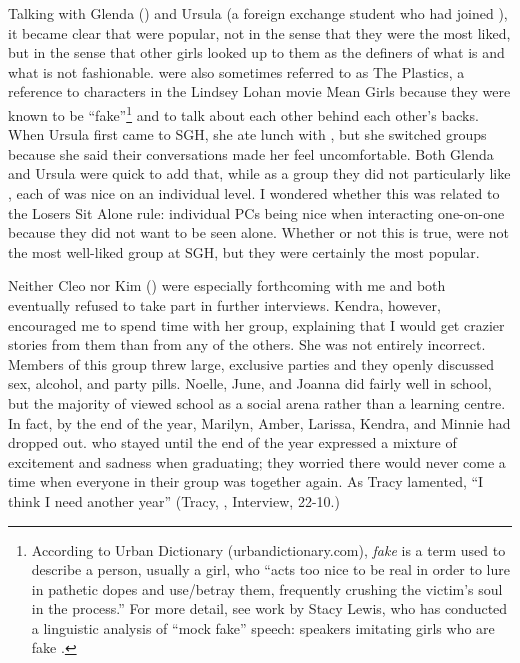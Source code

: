 Talking with Glenda () and Ursula (a foreign exchange student who had joined ), it became clear that  were popular, not in the sense that they were the most liked, but in the sense that other girls looked up to them as the definers of what is and what is not fashionable.  were also sometimes referred to as The Plastics, a reference to characters in the Lindsey Lohan movie Mean Girls because they were known to be ``fake''\footnote{According to Urban Dictionary (urbandictionary.com), \textit{fake} is a term used to describe a person, usually a girl, who ``acts too nice to be real in order to lure in pathetic dopes and use/betray them, frequently crushing the victim's soul in the process.''  For more detail, see work by Stacy Lewis, who has conducted a linguistic analysis of ``mock fake'' speech: speakers imitating girls who are fake \citep{lewis2007}.} and to talk about each other behind each other's backs. When Ursula first came to SGH, she ate lunch with , but she switched groups because she said their conversations made her feel uncomfortable. Both Glenda and Ursula were quick to add that, while as a group they did not particularly like , each of  was nice on an individual level. I wondered whether this was related to the Losers Sit Alone rule: individual PCs being nice when interacting one-on-one because they did not want to be seen alone. Whether or not this is true,  were not the most well-liked group at SGH, but they were certainly the most popular.


Neither Cleo nor Kim () were especially forthcoming with me and both eventually refused to take part in further interviews. Kendra, however, encouraged me to spend time with her group, explaining that I would get crazier stories from them than from any of the others. She was not entirely incorrect. Members of this group threw large, exclusive parties and they openly discussed sex, alcohol, and party pills. Noelle, June, and Joanna did fairly well in school, but the majority of  viewed school as a social arena rather than a learning centre. In fact, by the end of the year, Marilyn, Amber, Larissa, Kendra, and Minnie had dropped out.  who stayed until the end of the year expressed a mixture of excitement and sadness when graduating; they worried there would never come a time when everyone in their group was together again. As Tracy lamented, ``I think I need another year'' (Tracy, , Interview, 22-10.)




